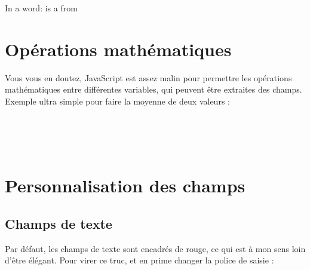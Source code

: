 \documentclass[12pt,oneside]{report}
\begin{document}
\begin{spacing}{1.2}
\begin{Cadre}
\begin{Form}
In a word: \TextField[name=name,readonly=true]{} is a \TextField[name=sextxt,readonly=true]{} from \TextField[name=countrytxt,readonly=true]{}
\end{Form}
\medskip
\end{Cadre}


\section*{Opérations mathématiques}

Vous vous en doutez, JavaScript est assez malin pour permettre les opérations mathématiques entre différentes variables, qui peuvent être extraites des champs. Exemple ultra simple pour faire la moyenne de deux valeurs :

\begin{Cadre}
\begin{Form}
  \\
  \\
  \\
\end{Form}
\medskip
\end{Cadre}


\section*{Personnalisation des champs}

\subsection*{Champs de texte}

Par défaut, les champs de texte sont encadrés de rouge, ce qui est à mon sens loin d’être élégant. Pour virer ce truc, et en prime changer la police de saisie :

\begin{Cadre}
\begin{Form}
\end{Form}
\medskip
\end{Cadre}




\end{spacing}
\end{document}
